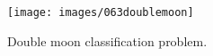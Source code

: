 \begin{figure}[!htb]
\centering
\texttt{[image: images/063doublemoon]}
\caption[Double moon classification problem]{Double moon classification
problem.}
\label{fig:063doublemoon}
\end{figure}
